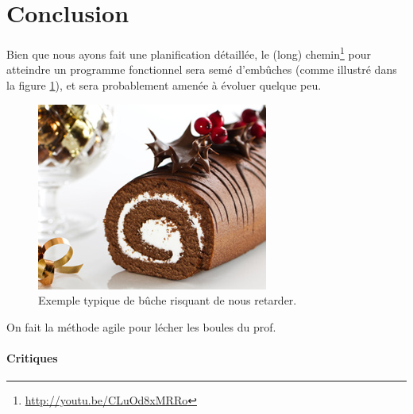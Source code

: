 \section{Conclusion}
	\label{sec:conclusion}

	Bien que nous ayons fait une planification détaillée, le (long) chemin\footnote{\url{http://youtu.be/CLuOd8xMRRo}} pour atteindre un programme fonctionnel sera semé d'embûches (comme illustré dans la figure \ref{fig:buche}), et sera probablement amenée à évoluer quelque peu.

	\begin{figure}
		\centering
		\includegraphics{figure/buche.jpg}
		\caption{Exemple typique de bûche risquant de nous retarder.}
		\label{fig:buche}
	\end{figure}

	On fait la méthode agile pour lécher les boules du prof.

	\paragraph{Critiques}